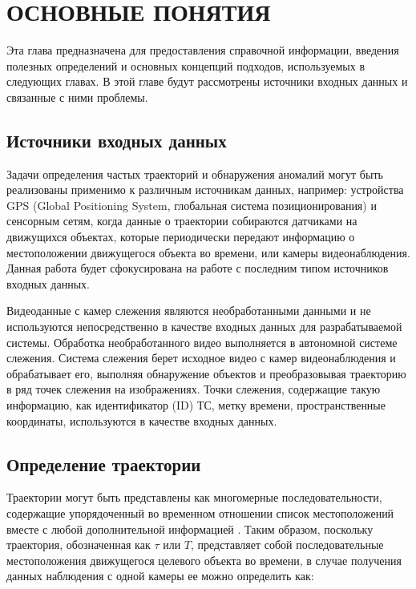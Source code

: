 \chapter{ОСНОВНЫЕ ПОНЯТИЯ}
\label{ch:ОСНОВНЫЕ ПОНЯТИЯ}

Эта глава предназначена для предоставления справочной информации, введения полезных определений и основных концепций подходов, используемых в следующих главах. В этой главе будут рассмотрены источники входных данных и связанные с ними проблемы.

\section{Источники входных данных}

Задачи определения частых траекторий и обнаружения аномалий могут быть реализованы применимо к различным источникам данных, например: устройства GPS (Global Positioning System, глобальная система позиционирования) и сенсорным сетям, когда данные о траектории собираются датчиками на движущихся объектах, которые периодически передают информацию о местоположении движущегося объекта во времени, или камеры видеонаблюдения. Данная работа будет сфокусирована на работе с последним типом источников входных данных.

Видеоданные с камер слежения являются необработанными данными и не используются непосредственно в качестве входных данных для разрабатываемой системы. Обработка необработанного видео выполняется в автономной системе слежения. Система слежения берет исходное видео с камер видеонаблюдения и обрабатывает его, выполняя обнаружение объектов и преобразовывая траекторию в ряд точек слежения на изображениях. Точки слежения, содержащие такую информацию, как идентификатор (ID) ТС, метку времени, пространственные координаты, используются в качестве входных данных.

\section{Определение траектории}

Траектории могут быть представлены как многомерные последовательности, содержащие упорядоченный во временном отношении список местоположений вместе с любой дополнительной информацией \cite{article:1_survey_stdm}. Таким образом, поскольку траектория, обозначенная как $\tau$ или $T$, представляет собой последовательные местоположения движущегося целевого объекта во времени, в случае получения данных наблюдения с одной камеры ее можно определить как:

